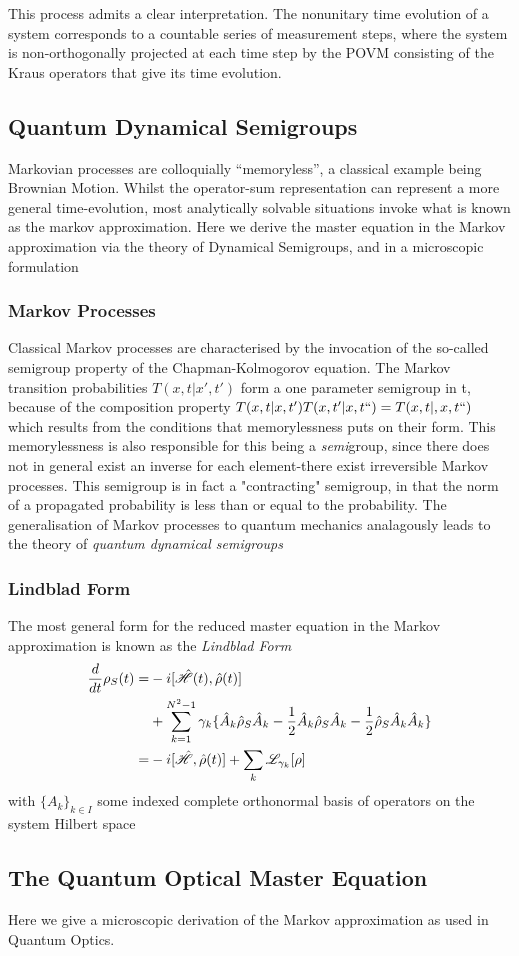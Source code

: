 This process admits a clear interpretation. The nonunitary time evolution of a system corresponds to a countable series of measurement steps, where the system is non-orthogonally projected at each time step by the POVM consisting of the Kraus operators that give its time evolution.
\subsection{Quantum Dynamical Semigroups}
Markovian processes are colloquially ``memoryless'', a classical example being Brownian Motion. Whilst the operator-sum representation can represent a more general time-evolution, most analytically solvable situations invoke what is known as the markov approximation. Here we derive the master equation in the Markov approximation via the theory of Dynamical Semigroups, and in a microscopic formulation
\subsubsection{Markov Processes}
Classical Markov processes are characterised by the invocation of the so-called semigroup property of the Chapman-Kolmogorov equation. The Markov transition probabilities $T(x, t|x', t')$ form a one parameter semigroup in t, because of the composition property $T(x, t|x, t')T(x, t'|x, t``) = T(x, t|,x, t``)$ which results from the conditions that memorylessness puts on their form. This memorylessness is also responsible for this being a \emph{semi}group, since there does not in general exist an inverse for each element-there exist irreversible Markov processes.
This semigroup is in fact a "contracting" semigroup, in that the norm of a propagated probability is less than or equal to the probability.
The generalisation of Markov processes to quantum mechanics analagously leads to the theory of \emph{quantum dynamical semigroups}

\subsubsection{Lindblad Form}
The most general form\cite[119--122]{Breuer2002} for the reduced master equation in the Markov approximation is known as the \emph{Lindblad Form}
\begin{align}
        \frac{d}{dt} \rho_S (t) =& -i[\hat{\mathscr{H}} (t), \hat{\rho} (t)\notag]\\
                                 & + \sum_{k=1}^{N^2-1} \gamma_k \{ \hat{A}_k \hat{\rho}_S \hat{A}_k -\frac{1}{2}  \hat{A}_k \hat{\rho}_S \hat{A}_k -\frac{1}{2} \hat{\rho}_S \hat{A}_k \hat{A}_k \}\\
        = & -i[\hat{\mathscr{H}}, \hat{\rho}(t)]+ \sum_k \mathscr{L}_{\gamma_{k}} [\rho]
\end{align}
with ${\{A_k\}}_{k \in I}$ some indexed complete orthonormal basis of operators on the system Hilbert space
\subsection{The Quantum Optical Master Equation}\cite{Breuer2002}\cite{Walls2008}
Here we give a microscopic derivation of the Markov approximation as used in Quantum Optics.
